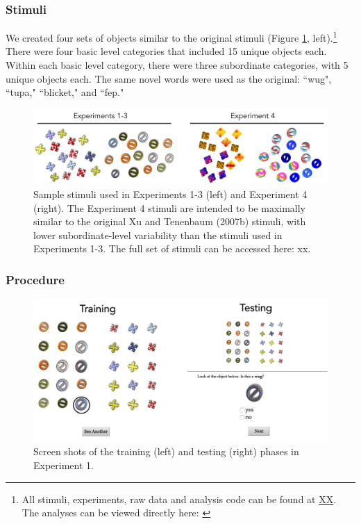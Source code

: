 \documentclass[man]{apa2}
\begin{document}
\subsubsection{Stimuli}
We created four sets of objects similar to the original  stimuli (Figure \ref{fig:stims}, left).\footnote{All stimuli, experiments, raw data and analysis code can be found at \url{XX}. The analyses can be viewed directly here: \url{}} There were four basic level categories that included 15 unique objects each. Within each basic level category, there were three subordinate categories, with 5 unique objects each. The same novel words were used as the original: ``wug", ``tupa," ``blicket," and ``fep."
\begin{figure}[t]
 \begin{center} 
  \includegraphics[width=5in]{figures/stims.png} 
  \caption{ \label{fig:stims} Sample stimuli used in Experiments 1-3 (left) and Experiment 4 (right). The Experiment 4 stimuli are intended to be maximally similar to the original Xu and Tenenbaum (2007b) stimuli, with lower subordinate-level variability than the stimuli used in Experiments 1-3. The full set of stimuli can be accessed here: xx.  } 
 \end{center} 
\end{figure}	
 
\subsubsection{Procedure}
 \begin{figure} [t]
 \begin{center} 
  \includegraphics[width=5.5in]{figures/screen.png} 
  \caption{\label{fig:screen} Screen shots of the training (left) and testing (right) phases in Experiment 1. } 
 \end{center} 
\end{figure}
\end{document}
